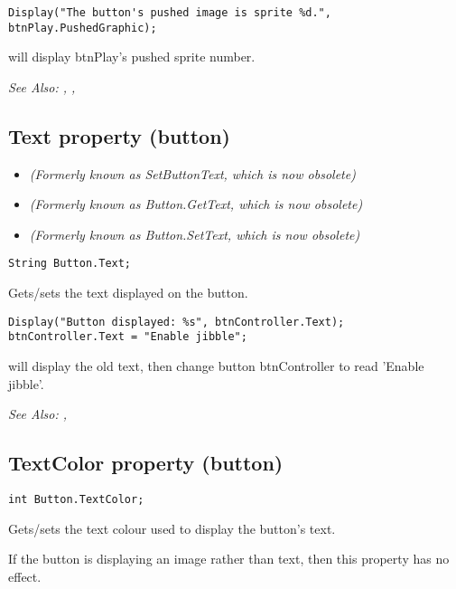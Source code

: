 \begin{verbatim}
Display("The button's pushed image is sprite %d.", btnPlay.PushedGraphic);
\end{verbatim}
will display btnPlay's pushed sprite number.

\it{See Also:} ,
,


\subsection{Text property (button)}\label{Button.Text}%

\begin{itemize}
\item \it{(Formerly known as SetButtonText, which is now obsolete)}
\item \it{(Formerly known as Button.GetText, which is now obsolete)}
\item \it{(Formerly known as Button.SetText, which is now obsolete)}
\end{itemize}

\begin{verbatim}
String Button.Text;
\end{verbatim}
Gets/sets the text displayed on the button.

\begin{verbatim}
Display("Button displayed: %s", btnController.Text);
btnController.Text = "Enable jibble";
\end{verbatim}
will display the old text, then change button btnController to read 'Enable jibble'.

\it{See Also:} , 


\subsection{TextColor property (button)}\label{Button.TextColor}%

\begin{verbatim}
int Button.TextColor;
\end{verbatim}
Gets/sets the text colour used to display the button's text.

If the button is displaying an image rather than text, then this property has no effect.

